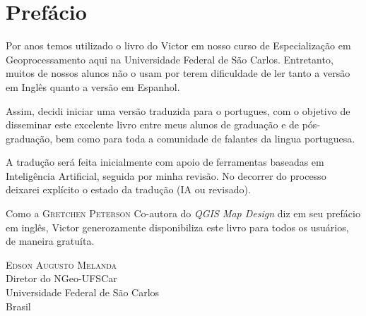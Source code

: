 \chapter*{Prefácio}

Por anos temos utilizado o livro do Victor em nosso curso de Especialização em Geoprocessamento aqui na Universidade Federal de São Carlos. Entretanto, muitos de nossos alunos não o usam por terem dificuldade de ler tanto a versão em Inglês quanto a versão em Espanhol.

Assim, decidi iniciar uma versão traduzida para o portugues, com o objetivo de disseminar este excelente livro entre meus alunos de graduação e de pós-graduação, bem como para toda a comunidade de falantes da lingua portuguesa.

A tradução será feita inicialmente com apoio de ferramentas baseadas em Inteligência Artificial, seguida por minha revisão. No decorrer do processo deixarei explícito o estado da tradução (IA ou revisado).

Como a \textsc{Gretchen Peterson} Co-autora do \textit{QGIS Map Design} diz em seu prefácio em inglês, Victor generozamente disponibiliza este livro para todos os usuários, de maneira gratuíta. 



\begin{flushright}
    \textsc{Edson Augusto Melanda}\\
    Diretor do NGeo-UFSCar \\
    Universidade Federal de São Carlos\\
    Brasil
    \end{flushright}